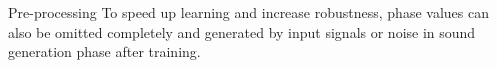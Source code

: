 \documentclass{beamer}
\begin{document}
	\begin{frame}{Pre-processing}
	To speed up learning and increase robustness, phase values can also be omitted completely 
	and generated by input signals or noise in sound generation phase after training.
	\end{frame}








		
\end{document}
